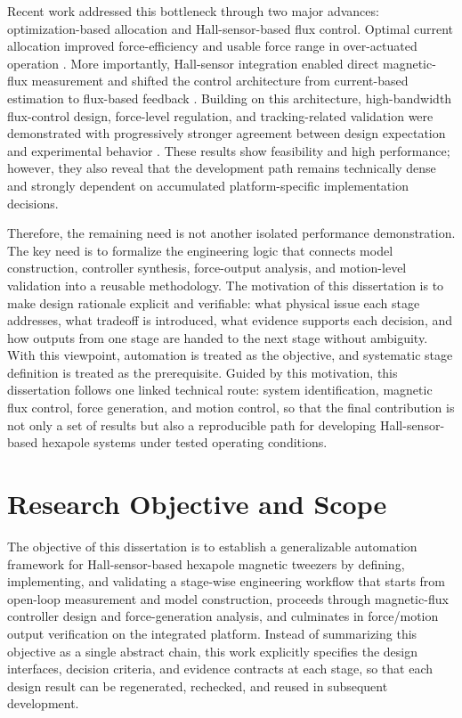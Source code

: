 Recent work addressed this bottleneck through two major advances: optimization-based allocation and Hall-sensor-based flux control. Optimal current allocation improved force-efficiency and usable force range in over-actuated operation \cite{long2021optimal}. More importantly, Hall-sensor integration enabled direct magnetic-flux measurement and shifted the control architecture from current-based estimation to flux-based feedback \cite{long2022hallsensor}. Building on this architecture, high-bandwidth flux-control design, force-level regulation, and tracking-related validation were demonstrated with progressively stronger agreement between design expectation and experimental behavior \cite{meng2023ultraprecise,meng2024piconewton,meng2025nearwall}. These results show feasibility and high performance; however, they also reveal that the development path remains technically dense and strongly dependent on accumulated platform-specific implementation decisions.

Therefore, the remaining need is not another isolated performance demonstration. The key need is to formalize the engineering logic that connects model construction, controller synthesis, force-output analysis, and motion-level validation into a reusable methodology. The motivation of this dissertation is to make design rationale explicit and verifiable: what physical issue each stage addresses, what tradeoff is introduced, what evidence supports each decision, and how outputs from one stage are handed to the next stage without ambiguity. With this viewpoint, automation is treated as the objective, and systematic stage definition is treated as the prerequisite. Guided by this motivation, this dissertation follows one linked technical route: system identification, magnetic flux control, force generation, and motion control, so that the final contribution is not only a set of results but also a reproducible path for developing Hall-sensor-based hexapole systems under tested operating conditions.

\section{Research Objective and Scope}

The objective of this dissertation is to establish a generalizable automation framework for Hall-sensor-based hexapole magnetic tweezers by defining, implementing, and validating a stage-wise engineering workflow that starts from open-loop measurement and model construction, proceeds through magnetic-flux controller design and force-generation analysis, and culminates in force/motion output verification on the integrated platform. Instead of summarizing this objective as a single abstract chain, this work explicitly specifies the design interfaces, decision criteria, and evidence contracts at each stage, so that each design result can be regenerated, rechecked, and reused in subsequent development.

